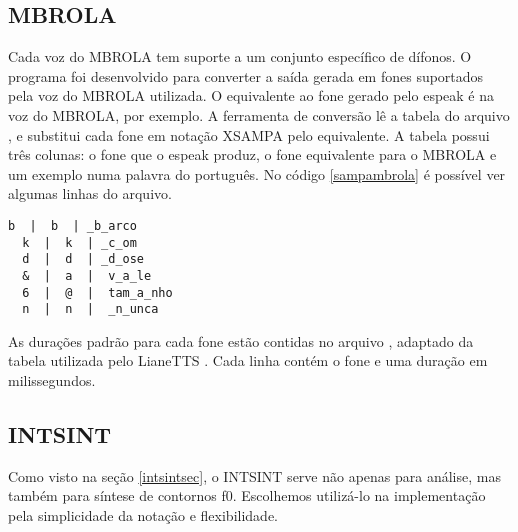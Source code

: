 
\subsection{MBROLA}
Cada voz do MBROLA tem suporte a um conjunto específico de dífonos. O programa
 foi desenvolvido para converter a saída gerada em fones
suportados pela voz do MBROLA utilizada. O equivalente ao fone \code{/&/} gerado
pelo espeak é  na voz do MBROLA, por exemplo. A ferramenta de conversão
lê a tabela do arquivo , e substitui cada fone em notação
XSAMPA pelo equivalente. A tabela possui três colunas: o fone que o espeak
produz, o fone equivalente para o MBROLA e um exemplo numa palavra do português.
No código \ref{sampambrola} é possível ver algumas linhas do arquivo.

\begin{lstlisting}[caption=Extrato de linhas da tabela de conversão, label=sampambrola]
  b  |  b  | _b_arco
  k  |  k  | _c_om
  d  |  d  | _d_ose
  &  |  a  |  v_a_le
  6  |  @  |  tam_a_nho
  n  |  n  |  _n_unca
\end{lstlisting}

As durações padrão para cada fone estão contidas no arquivo
, adaptado da tabela utilizada pelo LianeTTS
\cite{lianetts}. Cada linha contém o fone e uma duração em milissegundos.

\subsection{INTSINT}
\label{intsintrules}
Como visto na seção \ref{intsintsec}, o INTSINT serve não apenas para análise,
mas também para síntese de contornos f0. Escolhemos utilizá-lo na implementação
pela simplicidade da notação e flexibilidade.


